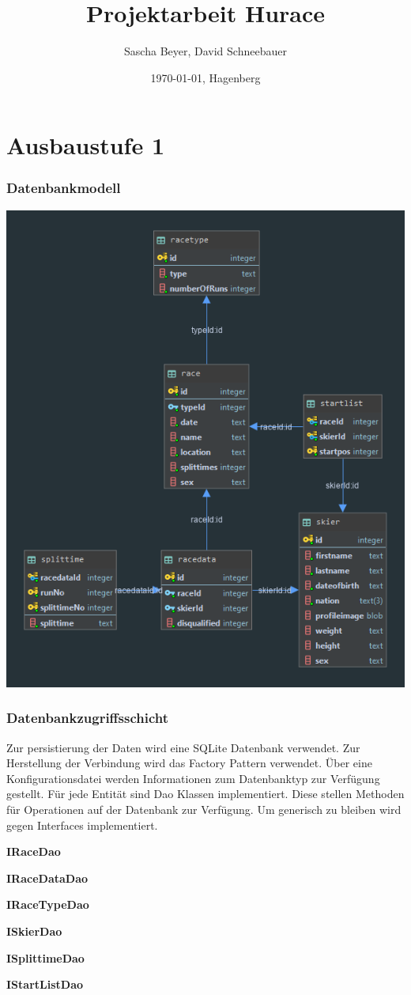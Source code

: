 \documentclass[a4paper, 12pt]{article}
\title{Projektarbeit Hurace}
\author{Sascha Beyer, David Schneebauer}
\date{\today{}, Hagenberg}
\begin{document}
	\maketitle
	\tableofcontents
	\newpage
	\section{Ausbaustufe 1}
	\subsubsection{Datenbankmodell}

	\includegraphics[width=.7\textwidth]{img/huraceDB.png}
	\newpage
	\subsubsection{Datenbankzugriffsschicht}
	Zur persistierung der Daten wird eine SQLite Datenbank verwendet. Zur Herstellung der Verbindung wird das Factory Pattern verwendet. Über eine Konfigurationsdatei werden Informationen zum Datenbanktyp zur Verfügung gestellt. Für jede Entität sind Dao Klassen implementiert. Diese stellen Methoden für Operationen auf der Datenbank zur Verfügung. Um generisch zu bleiben wird gegen Interfaces implementiert.
	\newline
	 
	\textbf{IRaceDao}
	
	\textbf{IRaceDataDao}
	
	\textbf{IRaceTypeDao}
	
	\textbf{ISkierDao}
	
	\textbf{ISplittimeDao}
	
	\textbf{IStartListDao}
	
	
\end{document}
